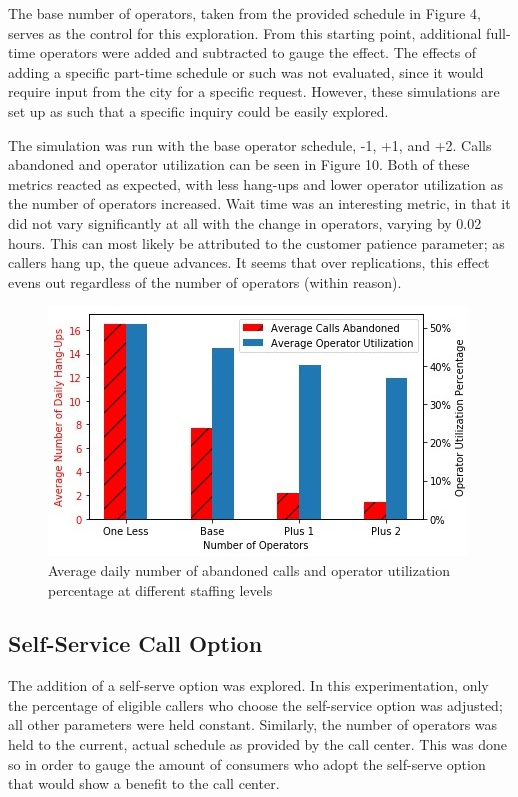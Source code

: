 \documentclass[12pt]{article}
\begin{document}
	\par
	
	The base number of operators, taken from the provided schedule in Figure 4, serves as the control for this exploration.  From this starting point, additional full-time operators were added and subtracted to gauge the effect.  The effects of adding a specific part-time schedule or such was not evaluated, since it would require input from the city for a specific request.  However, these simulations are set up as such that a specific inquiry could be easily explored.
	
	\par
	
	The simulation was run with the base operator schedule, -1, +1, and +2.  Calls abandoned and operator utilization can be seen in Figure 10.  Both of these metrics reacted as expected, with less hang-ups and lower operator utilization as the number of operators increased.  Wait time was an interesting metric, in that it did not vary significantly at all with the change in operators, varying by 0.02 hours.  This can most likely be attributed to the customer patience parameter; as callers hang up, the queue advances.  It seems that over replications, this effect evens out regardless of the number of operators (within reason).
	
	\begin{figure}[h]
		\includegraphics[scale=.5]{Inkednum_ops_plot_LI.jpg}
		\caption{Average daily number of abandoned calls and operator utilization percentage at different staffing levels}
	\end{figure}
	
	
	\subsection{Self-Service Call Option}

	The addition of a self-serve option was explored.  In this experimentation, only the percentage of eligible callers who choose the self-service option was adjusted; all other parameters were held constant.  Similarly, the number of operators was held to the current, actual schedule as provided by the call center.  This was done so in order to gauge the amount of consumers who adopt the self-serve option that would show a benefit to the call center.
	
\end{document}
